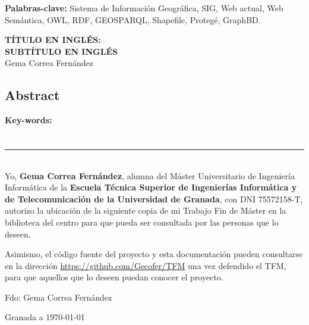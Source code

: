 \vspace{0.25in}

{\bf Palabras-clave:} Sistema de Información Geográfica, SIG, Web actual, Web Semántica, OWL, RDF, GEOSPARQL, Shapefile, Protegé, GraphBD.

\cleardoublepage


\thispagestyle{empty}


\begin{center} 
	\large{\textbf{TÍTULO EN INGLÉS:\\ SUBTÍTULO EN INGLÉS}}\\
	\vspace{0.25in}
	Gema Correa Fernández
\end{center}

\section*{Abstract} 



\vspace{0.25in}

{\bf Key-words:} 

\chapter*{}
\thispagestyle{empty}

\noindent\rule[-1ex]{\textwidth}{2pt}\\[4.5ex]

Yo, \textbf{Gema Correa Fernández}, alumna del Máster Universitario de Ingeniería Informática de la \textbf{Escuela Técnica Superior de Ingenierías Informática y de Telecomunicación de la Universidad de Granada}, con DNI 75572158-T, autorizo la ubicación de la siguiente copia de mi Trabajo Fin de Máster en la biblioteca del centro para que pueda ser consultada por las personas que lo deseen.\newline

Asimismo, el código fuente del proyecto y esta documentación pueden consultarse en la dirección \url{https://github.com/Gecofer/TFM} una vez defendido el TFM, para que aquellos que lo deseen puedan conocer el proyecto.

\vspace{5cm}

\noindent Fdo: Gema Correa Fernández

\vspace{2cm}

\begin{flushright}
Granada a \today
\end{flushright}


